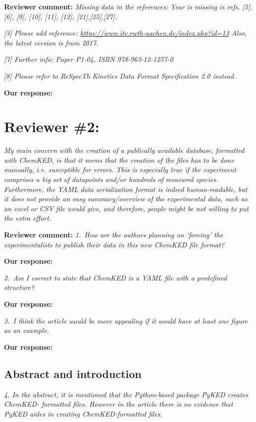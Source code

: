 \documentclass[a4paper,10pt]{elsarticle}
\begin{document}
\textbf{Reviewer comment:}
\textit{Missing data in the references: Year is missing is refs. [5], [6], [9], [10], [11], [12], [21],[25],[27].
}

\textit{[3] Please add reference: \url{https://www.itv.rwth-aachen.de/index.php?id=13}
Also, the latest version is from 2017.
}

\textit{[7] Further info:  Paper P1-04, ISBN 978-963-12-1257-0}

\textit{[8] Please refer to ReSpecTh Kinetics Data Format Specification 2.0 instead.}

\textbf{Our response:}





\section*{Reviewer \#2:}

\textit{My main concern with the creation of a publically available database, formatted with ChemKED, is that it seems that the creation of the files has to be done manually, i.e. susceptible for errors. This is especially true if the experiment comprises a big set of datapoints and/or hundreds of measured species. Furthermore, the YAML data serialization format is indeed human-readable, but it does not provide an easy summary/overview of the experimental data, such as an excel or CSV file would give, and therefore, people might be not willing to put the extra effort.}


\textbf{Reviewer comment:}
\textit{1.~How are the authors planning on ‘forcing’ the experimentalists to publish their data in this new ChemKED file format?}

\textbf{Our response:}

\textit{2.~Am I correct to state that ChemKED is a YAML file with a predefined structure?}

\textbf{Our response:}

\textit{3.~I think the article would be more appealing if it would have at least one figure as an example.}

\textbf{Our response:}


\subsection*{Abstract and introduction}
\textit{4. In the abstract, it is mentioned that the Python-based package PyKED creates ChemKED- formatted files. However in the article there is no evidence that PyKED aides in creating ChemKED-formatted files.}
\end{document}
